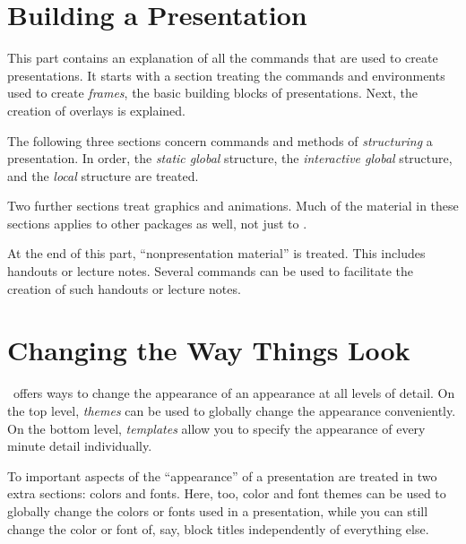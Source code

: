 \documentclass{ltxdoc}
\begin{document}
\part{Building a Presentation}

This part contains an explanation of all the commands that are used to
create presentations. It starts with a section treating the commands
and environments used to create \emph{frames}, the basic building
blocks of presentations. Next, the creation of overlays is
explained.

The following three sections concern commands and methods
of \emph{structuring} a presentation. In order, the \emph{static
  global} structure, the \emph{interactive global} structure, and the
\emph{local} structure are treated.

Two further sections treat graphics and animations. Much of the
material in these sections applies to other packages as well, not just
to \beamer.

At the end of this part, ``nonpresentation material'' is treated. This
includes handouts or lecture notes. Several commands can be used to
facilitate the creation of such handouts or lecture notes.












\part{Changing the Way Things Look}

\beamer\ offers ways to change the appearance of an appearance at all
levels of detail. On the top level, \emph{themes} can be used to
globally change the appearance conveniently. On the bottom level,
\emph{templates} allow you to specify the appearance of every minute
detail individually.

To important aspects of the ``appearance'' of a presentation are
treated in two extra sections: colors and fonts. Here, too, color and
font themes can be used to globally change the colors or fonts used in
a presentation, while you can still change the color or font of, say,
block titles independently of everything else. 





\end{document}
